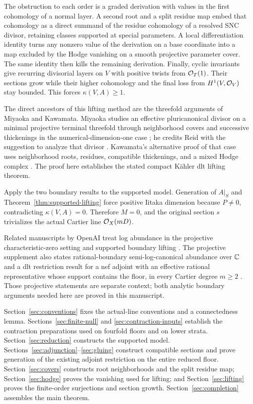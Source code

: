 The obstruction to each order is a graded derivation with values in the
first cohomology of a normal layer.  A second root and a split residue
map embed that cohomology as a direct summand of the residue cohomology
of a resolved SNC divisor, retaining classes supported at special
parameters.  A local differentiation identity turns any nonzero value
of the derivation on a base coordinate into a map excluded by the Hodge
vanishing on a smooth projective parameter cover.  The same identity
then kills the remaining derivation.  Finally, cyclic invariants give
recurring divisorial layers on \(V\) with positive twists from
\(\mathcal O_T(1)\).  Their sections grow while their higher cohomology and
the final loss from \(H^1(V,\mathcal O_V)\) stay bounded.  This forces
\(\kappa(V,A)\geq1\).

The direct ancestors of this lifting method are the threefold arguments
of Miyaoka and Kawamata.  Miyaoka studies an effective pluricanonical
divisor on a minimal projective terminal threefold through neighborhood
covers and successive thickenings in the numerical-dimension-one case
\cite[Section~4]{Miyaoka1988}; he credits Reid with the suggestion to
analyze that divisor \cite[p.~220]{Miyaoka1988}.  Kawamata's alternative
proof of that case uses neighborhood roots, residues, compatible
thickenings, and a mixed Hodge complex \cite[Section~4]{Kawamata1992}.
The proof here establishes the stated compact K\"ahler dlt lifting
theorem.

Apply the two boundary results to the supported model.  Generation of
\(A|_S\) and Theorem~\ref{thm:supported-lifting} force positive Iitaka
dimension because \(P\ne0\), contradicting \(\kappa(V,A)=0\).
Therefore \(M=0\), and the original section \(s\) trivializes the
actual Cartier line \(\mathcal O_X(mD)\).

Related manuscripts by OpenAI treat log abundance in the projective
characteristic-zero setting \cite{OpenAILogAbundance2026} and supported
boundary lifting \cite{OpenAILifting2026}.  The projective supplement
also states rational-boundary semi-log-canonical abundance over \(\mathbb C\)
and a dlt restriction result for a nef adjoint with an effective rational
representative whose support contains the floor, in every Cartier degree
\(m\geq2\) \cite[Corollaries~11.5--11.6]{OpenAILogAbundance2026}.
Those projective statements are separate context; both analytic boundary
arguments needed here are proved in this manuscript.

Section~\ref{sec:conventions} fixes the actual-line conventions and a
connectedness lemma.  Sections~\ref{sec:finite-null} and
\ref{sec:contraction-inputs} establish the contraction preparations used
on fourfold floors and on lower strata.  Section~\ref{sec:reduction}
constructs the supported model.  Sections~\ref{sec:adjunction}--\ref{sec:gluing}
construct compatible sections and prove generation of the existing
adjoint restriction on the entire reduced floor.
Section~\ref{sec:covers} constructs root neighborhoods and the split
residue map; Section~\ref{sec:hodge} proves the vanishing used for lifting;
and Section~\ref{sec:lifting} proves the finite-order surjections and
section growth.  Section~\ref{sec:completion} assembles the main theorem.
